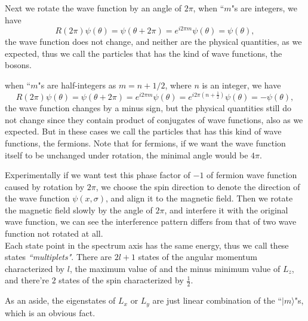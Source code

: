 \documentclass{article}
\newcommand{\be}{\begin{equation}}
\newcommand{\ee}{\end{equation}}
\renewcommand{\1}{\left}
\renewcommand{\2}{\right}
\newcommand{\ra}{\rangle}
\newcommand{\sig}{\sigma}
\renewcommand{\th}{\theta}
\begin{document}
Next we rotate the wave function by an angle of $2\pi$, when ``$m$"s are integers, we have
\be
R(2\pi)\psi(\th)=\psi(\th+2\pi)=e^{i2\pi m}\psi(\th)=\psi(\th),
\ee
the wave function does not change, and neither are the physical quantities, as we expected, thus we call the particles that has the kind of wave functions, the bosons.

when ``$m$"s are half-integers as $m=n+1/2$, where $n$ is an integer, we have
\be
R(2\pi)\psi(\th)=\psi(\th+2\pi)=e^{i2\pi m}\psi(\th)=e^{i2\pi (n+\frac 1 2)}\psi(\th)=-\psi(\th),
\ee
the wave function changes by a minus sign, but the physical quantities still do not change since they contain product of conjugates of wave functions, also as we expected. But in these cases we call the particles that has this kind of wave functions, the fermions. Note that for fermions, if we want the wave function itself to be unchanged under rotation, the minimal angle would be $4\pi$.

Experimentally if we want test this phase factor of $-1$ of fermion wave function caused by rotation by $2\pi$, we choose the spin direction to denote the direction of the wave function $\psi(x,\sig)$, and align it to the magnetic field. Then we rotate the magnetic field slowly by the angle of $2\pi$, and interfere it with the original wave function, we can see the interference pattern differs from that of two wave function not rotated at all.\\



Each state point in the spectrum axis has the same energy, thus we call these states \textit{``multiplets"}. There are $2l+1$ states of the angular momentum characterized by $l$, the maximum value of and the minus minimum value of $L_z$, and there're $2$ states of the spin characterized by $\frac 1 2$. 

As an aside, the eigenstates of $L_x$ or $L_y$ are just linear combination of the ``$|m\ra$"s, which is an obvious fact.\\
\end{document}
